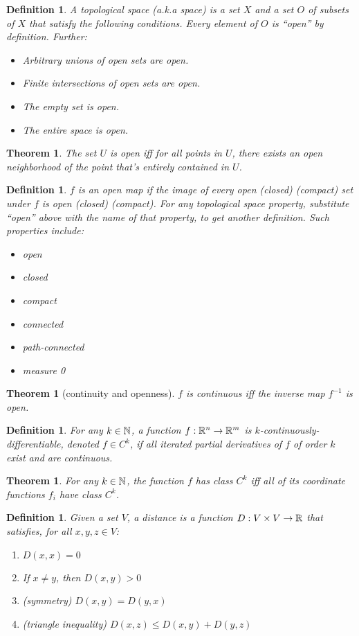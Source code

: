 \documentclass[11pt,leqno,oneside]{amsart}
\theoremstyle{mystyle} \newtheorem{thrm}[thm]{Theorem}
\theoremstyle{mystyle} \newtheorem{defi}[thm]{Definition}
\begin{document}
\begin{defi}
	A \emph{topological space} (a.k.a \emph{space}) is a set $X$ and a set $O$ of subsets of $X$ that satisfy the following conditions.  Every element of $O$ is ``open'' by definition.  Further:
	\begin{itemize}
		\item Arbitrary unions of open sets are open.
		\item Finite intersections of open sets are open.
		\item The empty set is open.
		\item The entire space is open.
	\end{itemize}
\end{defi}
\begin{thrm}
	The set $U$ is open iff for all points in $U$, there exists an open neighborhood of the point that's entirely contained in $U$.
\end{thrm}
\begin{defi}
	$f$ is an \emph{open} map if the image of every open (closed) (compact) set under $f$ is open (closed) (compact).
	For any topological space property, substitute ``open'' above with the name of that property, to get another definition.  Such properties include:
	\begin{itemize}
		\item open
		\item closed
		\item compact
		\item connected
		\item path-connected
		\item measure 0
	\end{itemize}
\end{defi}
\begin{thrm}[continuity and openness]
	$f$ is continuous iff the inverse map $f^{-1}$ is open.
\end{thrm}
\begin{defi}
	For any $k \in {\mathbb N}$, a function $f:{\mathbb R}^n \to {\mathbb R}^m$ is \emph{$k$-continuously-differentiable}, denoted $f \in C^k$, if all iterated partial derivatives of $f$ of order $k$ exist and are continuous.
\end{defi}
\begin{thrm}
	For any $k \in {\mathbb N}$, the function $f$ has class $C^k$ iff all of its coordinate functions $f_i$ have class $C^k$.
\end{thrm}
\begin{defi}
	Given a set $V$, a \emph{distance} is a function $D : V \times V \to {\mathbb R}$ that satisfies, for all $x, y, z \in V$:
	\begin{enumerate}
		\item $D(x,x) = 0$
		\item If $x \neq y$, then $D(x,y) > 0$
		\item (symmetry) $D(x,y) = D(y,x)$
		\item (triangle inequality) $D(x,z) \leq D(x,y) + D(y,z)$
	\end{enumerate}
\end{defi}
\end{document}
